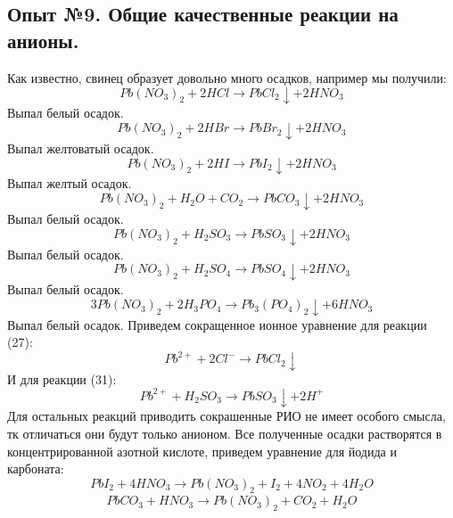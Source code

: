 \documentclass[a4paper,12pt]{article}
\begin{document}
 \subsection{Опыт №9. Общие качественные реакции на анионы.}
 Как известно, свинец образует довольно много осадков, например мы получили:
 \begin{equation}
    Pb(NO_3)_2 + 2HCl \xrightarrow[]{} PbCl_2 \downarrow + 2HNO_3
 \end{equation}
 Выпал белый осадок.
  \begin{equation}
     Pb(NO_3)_2 + 2HBr \xrightarrow[]{} PbBr_2 \downarrow+ 2HNO_3
 \end{equation}
 Выпал желтоватый осадок.
  \begin{equation}
     Pb(NO_3)_2 + 2HI \xrightarrow[]{} PbI_2\downarrow + 2HNO_3
 \end{equation}
 Выпал желтый осадок.
  \begin{equation}
    Pb(NO_3)_2 + H_2O + CO_2 \xrightarrow[]{} PbCO_3\downarrow + 2HNO_3
 \end{equation}
 Выпал белый осадок.
  \begin{equation}
     Pb(NO_3)_2 + H_2SO_3 \xrightarrow[]{} PbSO_3 \downarrow + 2HNO_3
 \end{equation}
 Выпал белый осадок.
  \begin{equation}
   Pb(NO_3)_2 + H_2SO_4 \xrightarrow[]{} PbSO_4 \downarrow + 2HNO_3 
 \end{equation}
 Выпал белый осадок.
  \begin{equation}
  3Pb(NO_3)_2 + 2H_3PO_4 \xrightarrow[]{} Pb_3(PO_4)_2\downarrow + 6HNO_3   
 \end{equation}
 Выпал белый осадок. Приведем сокращенное ионное уравнение для реакции (27):
  \begin{equation}
     Pb^{2+} + 2Cl^- \xrightarrow[]{} PbCl_2\downarrow
 \end{equation}
И для реакции (31):
\begin{equation}
    Pb^{2+} + H_2SO_3 \xrightarrow[]{} PbSO_3\downarrow + 2H^+
\end{equation}
Для остальных реакций приводить сокрашенные РИО не имеет особого смысла, тк отличаться они будут только анионом.\newline
Все полученные осадки растворятся в концентрированной азотной кислоте, приведем уравнение для йодида и карбоната:
\begin{equation}
    PbI_2 + 4HNO_3 \xrightarrow[]{} Pb(NO_3)_2 + I_2 + 4NO_2 + 4H_2O
\end{equation}
\begin{equation}
    PbCO_3 + HNO_3 \xrightarrow[]{} Pb(NO_3)_2 + CO_2 + H_2O
\end{equation}
\end{document}
